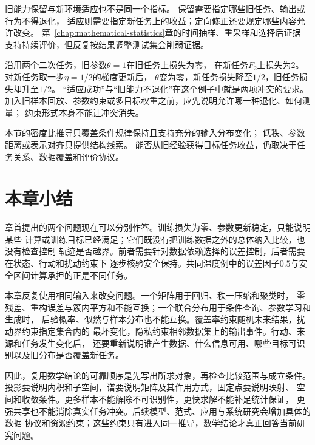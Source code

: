 旧能力保留与新环境适应也不是同一个指标。
保留需要指定哪些旧任务、输出或行为不得退化，
适应则需要指定新任务上的收益；定向修正还要规定哪些内容允许改变。
第~\ref{chap:mathematical-statistics}章的时间抽样、重采样和选择后证据
支持持续评价，但反复按结果调整测试集会削弱证据。

沿用两个二次任务，旧参数$\theta=1$在旧任务上损失为零，
在新任务$F_2$上损失为$2$。对新任务取一步$\eta=1/2$的梯度更新后，
$\theta$变为零，新任务损失降至$1/2$，旧任务损失却升至$1/2$。
“适应成功”与“旧能力不退化”在这个例子中就是两项冲突的要求。
加入旧样本回放、参数约束或多目标权重之前，应先说明允许哪一种退化、如何测量；
约束形式本身不能让冲突消失。

本节的密度比推导只覆盖条件规律保持且支持充分的输入分布变化；
低秩、参数距离或表示对齐只提供结构线索。
能否从旧经验获得目标任务收益，仍取决于任务关系、数据覆盖和评价协议。

\section{本章小结}
\label{sec:mathematics-and-future-research-summary}

章首提出的两个问题现在可以分别作答。训练损失为零、参数更新稳定，只能说明某些
计算或训练目标已经满足；它们既没有把训练数据之外的总体纳入比较，也没有检查控制
轨迹是否越界。前者需要针对数据依赖选择的误差控制，后者需要在状态、行动和扰动约束下
逐步核验安全保持。共同温度例中的误差因子$0.5$与安全区间计算承担的正是不同任务。

本章反复使用相同输入来改变问题。一个矩阵用于回归、秩一压缩和聚类时，
零残差、重构误差与簇内平方和不能互换；一个联合分布用于条件查询、参数学习和生成时，
后验概率、似然与样本分布也不能互换。覆盖率约束随机未来结果，扰动界约束指定集合内的
最坏变化，隐私约束相邻数据集上的输出事件。行动、来源和任务发生变化后，
还要重新说明谁产生数据、什么信息可用、哪些目标可识别以及旧分布是否覆盖新任务。

因此，复用数学结论的可靠顺序是先写出所求对象，再检查比较范围与成立条件。
投影要说明内积和子空间，谱要说明矩阵及其作用方式，固定点要说明映射、
空间和收敛条件。更多样本不能解除不可识别性，更快求解不能补足统计保证，
更强共享也不能消除真实任务冲突。后续模型、范式、应用与系统研究会增加具体的数据
协议和资源约束；这些约束只有进入同一推导，数学结论才真正回答当前研究问题。
